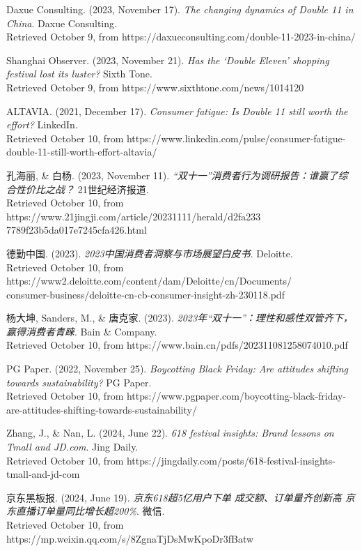 \documentclass[12pt]{ctexart}
\begin{document}
\begin{thebibliography}{99}
     Daxue Consulting. (2023, November 17). \textit{The changing dynamics of Double 11 in China}. Daxue Consulting.  \\ Retrieved October 9, from https://daxueconsulting.com/double-11-2023-in-china/

     Shanghai Observer. (2023, November 21). \textit{Has the ‘Double Eleven’ shopping festival lost its luster?} Sixth Tone.  \\ Retrieved October 9, from https://www.sixthtone.com/news/1014120

     ALTAVIA. (2021, December 17). \textit{Consumer fatigue: Is Double 11 still worth the effort?} LinkedIn. \\ Retrieved October 10, from https://www.linkedin.com/pulse/consumer-fatigue-double-11-still-worth-effort-altavia/

     孔海丽, \& 白杨. (2023, November 11). \textit{“双十一”消费者行为调研报告：谁赢了综合性价比之战？} 21世纪经济报道. \\ Retrieved October 10, from https://www.21jingji.com/article/20231111/herald/d2fa233 \\ 7789f23b5da017e7245cfa426.html

     德勤中国. (2023). \textit{2023中国消费者洞察与市场展望白皮书}. Deloitte. \\ Retrieved October 10, from https://www2.deloitte.com/content/dam/Deloitte/cn/Documents/\\consumer-business/deloitte-cn-cb-consumer-insight-zh-230118.pdf

     杨大坤, Sanders, M., \& 唐克家. (2023).  \textit{2023年“双十一”：理性和感性双管齐下，赢得消费者青睐}. Bain \& Company.  \\ Retrieved October 10, from https://www.bain.cn/pdfs/202311081258074010.pdf

     PG Paper. (2022, November 25). \textit{Boycotting Black Friday: Are attitudes shifting towards sustainability?} PG Paper.  \\ Retrieved October 10, from https://www.pgpaper.com/boycotting-black-friday-are-attitudes-shifting-towards-sustainability/

     Zhang, J., \& Nan, L. (2024, June 22). \textit{618 festival insights: Brand lessons on Tmall and JD.com}. Jing Daily. \\ Retrieved October 10, from https://jingdaily.com/posts/618-festival-insights-tmall-and-jd-com

     京东黑板报. (2024, June 19).  \textit{京东618超5亿用户下单 成交额、订单量齐创新高 京东直播订单量同比增长超200\%}. 微信. \\ Retrieved October 10, from https://mp.weixin.qq.com/s/8ZgnaTjDsMwKpoDr3fBatw


\end{thebibliography}
\end{document}

